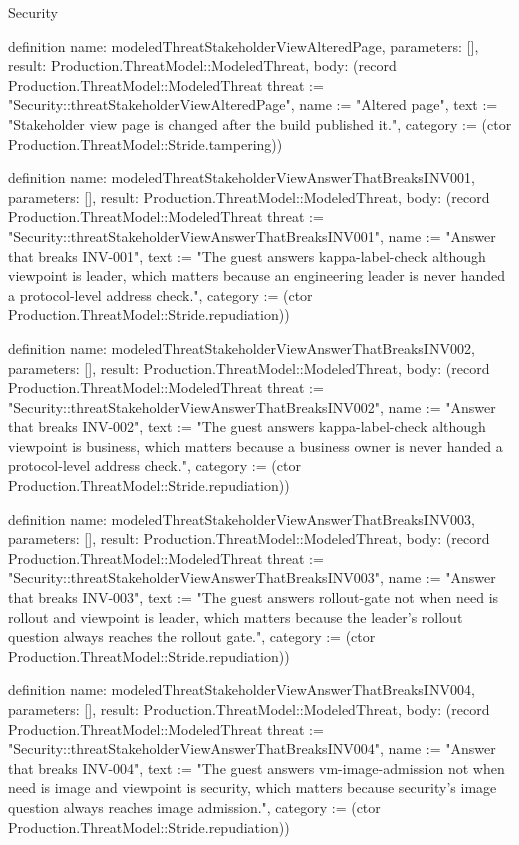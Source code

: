 \begin{lexlean}{Security}
\begin{semanticmodule}
definition{
  name: modeledThreatStakeholderViewAlteredPage,
  parameters: [],
  result: Production.ThreatModel::ModeledThreat,
  body: (record Production.ThreatModel::ModeledThreat {threat := "Security::threatStakeholderViewAlteredPage", name := "Altered page", text := "Stakeholder view page is changed after the build published it.", category := (ctor Production.ThreatModel::Stride.tampering)})
}

definition{
  name: modeledThreatStakeholderViewAnswerThatBreaksINV001,
  parameters: [],
  result: Production.ThreatModel::ModeledThreat,
  body: (record Production.ThreatModel::ModeledThreat {threat := "Security::threatStakeholderViewAnswerThatBreaksINV001", name := "Answer that breaks INV-001", text := "The guest answers kappa-label-check although viewpoint is leader, which matters because an engineering leader is never handed a protocol-level address check.", category := (ctor Production.ThreatModel::Stride.repudiation)})
}

definition{
  name: modeledThreatStakeholderViewAnswerThatBreaksINV002,
  parameters: [],
  result: Production.ThreatModel::ModeledThreat,
  body: (record Production.ThreatModel::ModeledThreat {threat := "Security::threatStakeholderViewAnswerThatBreaksINV002", name := "Answer that breaks INV-002", text := "The guest answers kappa-label-check although viewpoint is business, which matters because a business owner is never handed a protocol-level address check.", category := (ctor Production.ThreatModel::Stride.repudiation)})
}

definition{
  name: modeledThreatStakeholderViewAnswerThatBreaksINV003,
  parameters: [],
  result: Production.ThreatModel::ModeledThreat,
  body: (record Production.ThreatModel::ModeledThreat {threat := "Security::threatStakeholderViewAnswerThatBreaksINV003", name := "Answer that breaks INV-003", text := "The guest answers rollout-gate not when need is rollout and viewpoint is leader, which matters because the leader's rollout question always reaches the rollout gate.", category := (ctor Production.ThreatModel::Stride.repudiation)})
}

definition{
  name: modeledThreatStakeholderViewAnswerThatBreaksINV004,
  parameters: [],
  result: Production.ThreatModel::ModeledThreat,
  body: (record Production.ThreatModel::ModeledThreat {threat := "Security::threatStakeholderViewAnswerThatBreaksINV004", name := "Answer that breaks INV-004", text := "The guest answers vm-image-admission not when need is image and viewpoint is security, which matters because security's image question always reaches image admission.", category := (ctor Production.ThreatModel::Stride.repudiation)})
}


\end{semanticmodule}
\end{lexlean}
